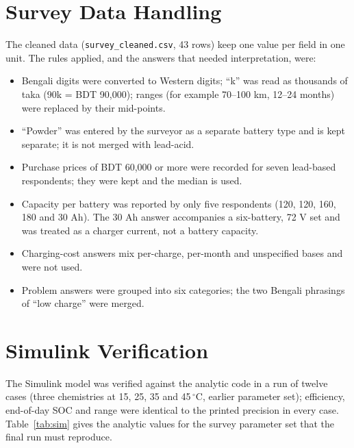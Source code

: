 \appendices
\section{Survey Data Handling}
\label{app:survey}
The cleaned data (\texttt{survey\_cleaned.csv}, 43 rows) keep one value per field in one unit. The rules applied, and the answers that needed interpretation, were:
\begin{itemize}
\item Bengali digits were converted to Western digits; ``k'' was read as thousands of taka (90k = BDT 90{,}000); ranges (for example 70--100 km, 12--24 months) were replaced by their mid-points.
\item ``Powder'' was entered by the surveyor as a separate battery type and is kept separate; it is not merged with lead-acid.
\item Purchase prices of BDT 60{,}000 or more were recorded for seven lead-based respondents; they were kept and the median is used.
\item Capacity per battery was reported by only five respondents (120, 120, 160, 180 and 30 Ah). The 30 Ah answer accompanies a six-battery, 72 V set and was treated as a charger current, not a battery capacity.
\item Charging-cost answers mix per-charge, per-month and unspecified bases and were not used.
\item Problem answers were grouped into six categories; the two Bengali phrasings of ``low charge'' were merged.
\end{itemize}

\section{Simulink Verification}
\label{app:sim}
The Simulink model was verified against the analytic code in a run of twelve cases (three chemistries at 15, 25, 35 and 45\,$^\circ$C, earlier parameter set); efficiency, end-of-day SOC and range were identical to the printed precision in every case. Table~\ref{tab:sim} gives the analytic values for the survey parameter set that the final run must reproduce. 

